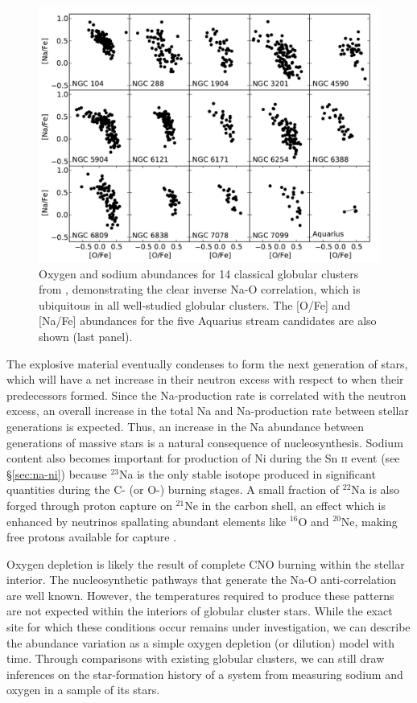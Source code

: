 \documentclass{emulateapj}
\begin{document}
\begin{figure}[t!]
	\includegraphics[width=\textwidth]{./figures/aquarius-o-na-cluster.pdf}
	\caption{Oxygen and sodium abundances for 14 classical globular clusters from \citet{carretta;et-al_2009a}, demonstrating the clear inverse Na-O correlation, which is ubiquitous in all well-studied globular clusters. The [O/Fe] and [Na/Fe] abundances for the five Aquarius stream candidates are also shown (last panel).}
	\label{fig:o-na-clusters}
\end{figure}


The explosive material eventually condenses to form the next generation of stars, which will have a net increase in their neutron excess with respect to when their predecessors formed. Since the Na-production rate is correlated with the neutron excess, an overall increase in the total Na and Na-production rate between stellar generations is expected. Thus, an increase in the Na abundance between generations of massive stars is a natural consequence of nucleosynthesis. Sodium content also becomes important for production of Ni during the Sn \textsc{ii} event (see \S\ref{sec:na-ni}) because $^{23}$Na is the only stable isotope produced in significant quantities during the C- (or O-) burning stages. A small fraction of $^{22}$Na is also forged through proton capture on $^{21}$Ne in the carbon shell, an effect which is enhanced by neutrinos spallating abundant elements like $^{16}$O and $^{20}$Ne, making free protons available for capture \citep{woosley;weaver_1995}.

Oxygen depletion is likely the result of complete CNO burning within the stellar interior. The nucleosynthetic pathways that generate the Na-O anti-correlation are well known. However, the temperatures required to produce these patterns are not expected within the interiors of globular cluster stars. While the exact site for which these conditions occur remains under investigation, we can describe the abundance variation as a simple oxygen depletion (or dilution) model with time. Through comparisons with existing globular clusters, we can still draw inferences on the star-formation history of a system from measuring sodium and oxygen in a sample of its stars.
\end{document}
